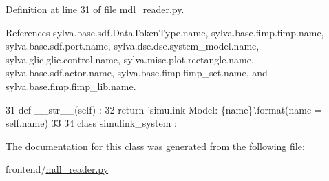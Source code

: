 Definition at line 31 of file mdl\+\_\+reader.\+py.



References sylva.\+base.\+sdf.\+Data\+Token\+Type.\+name, sylva.\+base.\+fimp.\+fimp.\+name, sylva.\+base.\+sdf.\+port.\+name, sylva.\+dse.\+dse.\+system\+\_\+model.\+name, sylva.\+glic.\+glic.\+control.\+name, sylva.\+misc.\+plot.\+rectangle.\+name, sylva.\+base.\+sdf.\+actor.\+name, sylva.\+base.\+fimp.\+fimp\+\_\+set.\+name, and sylva.\+base.\+fimp.\+fimp\+\_\+lib.\+name.


\begin{DoxyCode}
31     \textcolor{keyword}{def }\_\_str\_\_(self) :
32       \textcolor{keywordflow}{return} \textcolor{stringliteral}{'simulink Model: \{name\}'}.format(name = self.name)
33 
34   \textcolor{keyword}{class }simulink\_system :
\end{DoxyCode}


The documentation for this class was generated from the following file\+:\begin{DoxyCompactItemize}
\item 
frontend/\hyperlink{mdl__reader_8py}{mdl\+\_\+reader.\+py}\end{DoxyCompactItemize}
